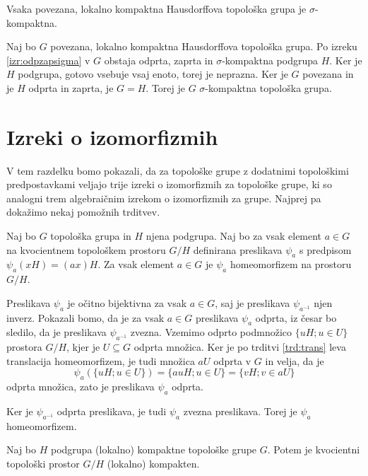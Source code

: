 \documentclass[mat1]{fmfdelo}
\begin{document}
\begin{posledica}
	Vsaka povezana, lokalno kompaktna Hausdorffova topološka grupa je $\sigma$-kompaktna.
\end{posledica}

\begin{dokaz}
	Naj bo $G$ povezana, lokalno kompaktna Hausdorffova topološka grupa. Po izreku \ref{izr:odpzapsigma} v $G$ obstaja odprta, zaprta in $\sigma$-kompaktna podgrupa $H$. Ker je $H$ podgrupa, gotovo vsebuje vsaj enoto, torej je neprazna. Ker je $G$ povezana in je $H$ odprta in zaprta, je $G = H$. Torej je $G$ $\sigma$-kompaktna topološka grupa. 
\end{dokaz}

\section{Izreki o izomorfizmih}
V tem razdelku bomo pokazali, da za topološke grupe z dodatnimi topološkimi predpostavkami veljajo trije izreki o izomorfizmih za topološke grupe, ki so analogni trem algebraičnim izrekom o izomorfizmih za grupe. Najprej pa dokažimo nekaj pomožnih trditvev.

\begin{trditev}\label{trd:homogenkvoc}
	Naj bo $G$ topološka grupa in $H$ njena podgrupa. Naj bo za vsak element $a \in G$ na kvocientnem topološkem prostoru $G/H$ definirana preslikava $\psi_a$ s predpisom $\psi_a(xH) = (ax)H$.
	Za vsak element $a \in G$ je $\psi_a$ homeomorfizem na prostoru $G/H$.
\end{trditev}

\begin{dokaz}
Preslikava $\psi_a$ je očitno bijektivna za vsak $a \in G$, saj je preslikava $\psi_{a^{-1}}$ njen inverz. Pokazali bomo, da je za vsak $a \in G$ preslikava $\psi_a$ odprta, iz česar bo sledilo, da je preslikava $\psi_{a^{-1}}$ zvezna.
Vzemimo odprto podmnožico $\lbrace uH ; u \in U \rbrace$ prostora $G/H$, kjer je $U \subseteq G$ odprta množica. 
Ker je po trditvi \ref{trd:trans} leva translacija homeomorfizem, je tudi množica $aU$ odprta v $G$ in velja, da je
\[ \psi_a(\lbrace uH ; u \in U \rbrace) = \lbrace auH ; u \in U \rbrace = \lbrace vH ; v \in aU \rbrace \]
odprta množica, zato je preslikava $\psi_a$ odprta.

Ker je $\psi_{a^{-1}}$ odprta preslikava, je tudi $\psi_a$ zvezna preslikava. Torej je $\psi_a$ homeomorfizem.
\end{dokaz}

\begin{trditev}\label{trd:kvockompakt}
	Naj bo $H$ podgrupa (lokalno) kompaktne topološke grupe $G$. Potem je kvocientni topološki prostor $G/H$ (lokalno) kompakten.
\end{trditev}
\end{document}
